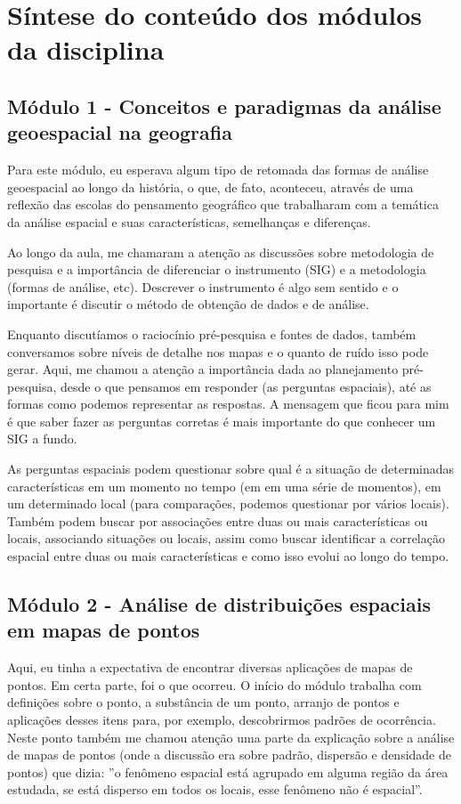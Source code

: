 \section{Síntese do conteúdo dos módulos da disciplina}

\subsection{Módulo 1 - Conceitos e paradigmas da análise geoespacial na geografia}

Para este módulo, eu esperava algum tipo de retomada das formas de análise geoespacial ao longo da história, o que, de fato, aconteceu, através de uma reflexão das escolas do pensamento geográfico que trabalharam com a temática da análise espacial e suas características, semelhanças e diferenças. 

Ao longo da aula, me chamaram a atenção as discussões sobre metodologia de pesquisa e a importância de diferenciar o instrumento (SIG) e a metodologia (formas de análise, etc). Descrever o instrumento é algo sem sentido e o importante é discutir o método de obtenção de dados e de análise. 

Enquanto discutíamos o raciocínio pré-pesquisa e fontes de dados, também conversamos sobre níveis de detalhe nos mapas e o quanto de ruído isso pode gerar. Aqui, me chamou a atenção a importância dada ao planejamento pré-pesquisa, desde o que pensamos em responder (as perguntas espaciais), até as formas como podemos representar as respostas. A mensagem que ficou para mim é que saber fazer as perguntas corretas é mais importante do que conhecer um SIG a fundo.

As perguntas espaciais podem questionar sobre qual é a situação de determinadas características em um momento no tempo (em em uma série de momentos), em um determinado local (para comparações, podemos questionar por vários locais). Também podem buscar por associações entre duas ou mais características ou locais, associando situações ou locais, assim como buscar identificar a correlação espacial entre duas ou mais características e como isso evolui ao longo do tempo.

\subsection{Módulo 2 - Análise de distribuições espaciais em mapas de pontos}

Aqui, eu tinha a expectativa de encontrar diversas aplicações de mapas de pontos. Em certa parte, foi o que ocorreu. O início do módulo trabalha com definições sobre o ponto, a substância de um ponto, arranjo de pontos e aplicações desses itens para, por exemplo, descobrirmos padrões de ocorrência. Neste ponto também me chamou atenção uma parte da explicação sobre a análise de mapas de pontos (onde a discussão era sobre padrão, dispersão e densidade de pontos) que dizia: ''o fenômeno espacial está agrupado em alguma região da área estudada, se está disperso em todos os locais, esse fenômeno não é espacial''.

